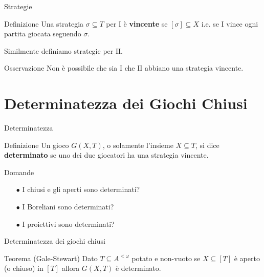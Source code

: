 \documentclass[aspectratio=43]{beamer}
\begin{document}
\begin{frame}{Strategie}
  \begin{block}{Definizione}
    Una strategia \(\sigma \subseteq T\) per \(\mathrm{I}\) è \textbf{vincente} se \([\sigma] \subseteq X\) i.e. se \(\mathrm{I}\) vince ogni partita giocata seguendo \(\sigma\).
  \end{block}
  \pause
  Similmente definiamo strategie per \(\mathrm{II}\).
  \pause
  \begin{block}{Osservazione}
    Non è possibile che sia \(\mathrm{I}\) che \(\mathrm{II}\) abbiano una strategia vincente.
  \end{block}
\end{frame}

\section{Determinatezza dei Giochi Chiusi}

\begin{frame}{Determinatezza}
  \begin{block}{Definizione}
    Un gioco \(G(X, T)\), o solamente l'insieme \(X \subseteq T\), si dice \textbf{determinato} se uno dei due giocatori ha una strategia vincente.
  \end{block}
  \pause
  \begin{block}{Domande}
    \begin{itemize}
    \item[\(\bullet\)] I chiusi e gli aperti sono determinati?
    \item[\(\bullet\)] I Boreliani sono determinati?
    \item[\(\bullet\)] I proiettivi sono determinati?
    \end{itemize}
  \end{block}
\end{frame}

\begin{frame}{Determinatezza dei giochi chiusi}
  \begin{block}{Teorema (Gale-Stewart)}
    Dato \(T \subseteq A^{<\omega}\) potato e non-vuoto se \(X \subseteq [T]\) è aperto (o chiuso) in \([T]\) allora \(G(X, T)\) è determinato.
  \end{block}
\end{frame}
\end{document}
